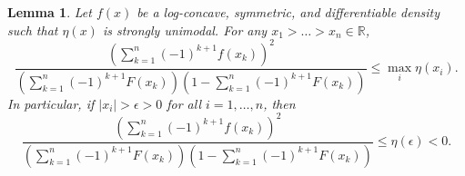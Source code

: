 \documentclass[letterpaper, 11pt]{IEEEtran}      %
\newtheorem{lem}[thm]{\bf {Lemma}}
\begin{document}
\begin{lem} \label{lem:bound_intervals}
Let $f(x)$ be a log-concave, symmetric, and differentiable density such that $\eta(x)$ is strongly unimodal. For any $x_1 > \ldots > x_n \in \mathbb R$, 
\begin{equation}
\frac{ \left(  \sum_{k=1}^n (-1)^{k+1} f(x_k) \right)^2} 
{\left( \sum_{k=1}^n (-1)^{k+1} F(x_k) \right)\left(1- \sum_{k=1}^n (-1)^{k+1} F(x_k) \right) } 
\leq \max_i \eta(x_i). \label{eq:lem_bound_intervals}
\end{equation}
In particular, if $|x_i|>\epsilon > 0$ for all $i=1,\ldots,n$, then 
\[
\frac{ \left(  \sum_{k=1}^n (-1)^{k+1} f(x_k) \right)^2} 
{\left( \sum_{k=1}^n (-1)^{k+1} F(x_k) \right)\left(1- \sum_{k=1}^n (-1)^{k+1} F(x_k) \right) } 
\leq \eta(\epsilon) < 0. 
\]
\end{lem}
\end{document}
